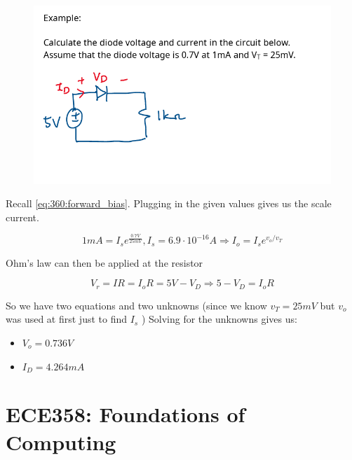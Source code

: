 \documentclass[10pt]{article}
\begin{document}
\begin{example}
	\begin{figure}[H]
		\centering
		\includegraphics[width=0.8\linewidth]{img/image_2022-09-13-13-55-18.png}
	\end{figure}

	Recall \eqref{eq:360:forward_bias}. Plugging in the given values gives us the scale current.

	\begin{equation}
		1mA = I_s e^{\frac{0.7V}{25mV}}, I_s = 6.9 \cdot 10^{-16} A \Rightarrow I_o = I_s e^{v_o/v_T}
	\end{equation}

	Ohm's law can then be applied at the resistor


	\begin{equation}
		V_r = IR = I_oR  = 5V - V_D \Rightarrow 5 - V_D = I_o R
	\end{equation}

	So we have two equations and two unknowns (since we know $ v_T = 25mV $ but $ v_o $ was used at first just to find $ I_s $ ) Solving for the unknowns gives us:

	\begin{itemize}
		\item $ V_o  = 0.736 V $
		\item $ I_D = 4.264 mA $ 
	\end{itemize}
\end{example}









\part{ECE358: Foundations of Computing}
\end{document}
